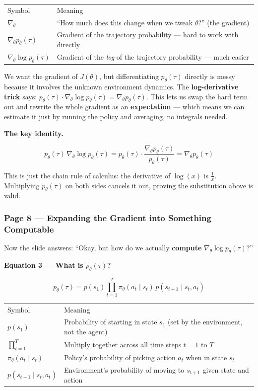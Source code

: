 \begin{tabular}{ll}
  Symbol & Meaning \\[4pt]
  $\nabla_\theta$ & ``How much does this change when we tweak $\theta$?'' (the gradient) \\
  $\nabla_\theta p_\theta(\tau)$ & Gradient of the trajectory probability --- hard to work with directly \\
  $\nabla_\theta \log p_\theta(\tau)$ & Gradient of the \textit{log} of the trajectory probability --- much easier \\
\end{tabular}

\medskip
We want the gradient of $J(\theta)$, but differentiating $p_\theta(\tau)$ directly is messy
because it involves the unknown environment dynamics. The \textbf{log-derivative trick} says:
$p_\theta(\tau)\cdot\nabla_\theta\log p_\theta(\tau) = \nabla_\theta p_\theta(\tau)$.
This lets us swap the hard term out and rewrite the whole gradient as an \textbf{expectation} ---
which means we can estimate it just by running the policy and averaging, no integrals needed.

\medskip
\textbf{The key identity.}

\[
  p_\theta(\tau)\,\nabla_\theta \log p_\theta(\tau)
  = p_\theta(\tau)\cdot\frac{\nabla_\theta p_\theta(\tau)}{p_\theta(\tau)}
  = \nabla_\theta p_\theta(\tau)
\]

This is just the chain rule of calculus: the derivative of $\log(x)$ is $\frac{1}{x}$.
Multiplying $p_\theta(\tau)$ on both sides cancels it out, proving the substitution above is valid.

\subsubsection*{Page 8 --- Expanding the Gradient into Something Computable}

Now the slide answers: ``Okay, but how do we actually \textbf{compute}
$\nabla_\theta\log p_\theta(\tau)$?''

\medskip
\textbf{Equation 3 --- What is $p_\theta(\tau)$?}

\[
  p_\theta(\tau)
  = p(s_1)\prod_{t=1}^{T}\pi_\theta(a_t\mid s_t)\,p(s_{t+1}\mid s_t,a_t)
\]

\begin{tabular}{ll}
  Symbol & Meaning \\[4pt]
  $p(s_1)$ & Probability of starting in state $s_1$ (set by the environment, not the agent) \\
  $\prod_{t=1}^T$ & Multiply together across all time steps $t=1$ to $T$ \\
  $\pi_\theta(a_t\mid s_t)$ & Policy's probability of picking action $a_t$ when in state $s_t$ \\
  $p(s_{t+1}\mid s_t,a_t)$ & Environment's probability of moving to $s_{t+1}$ given state and action \\
\end{tabular}

